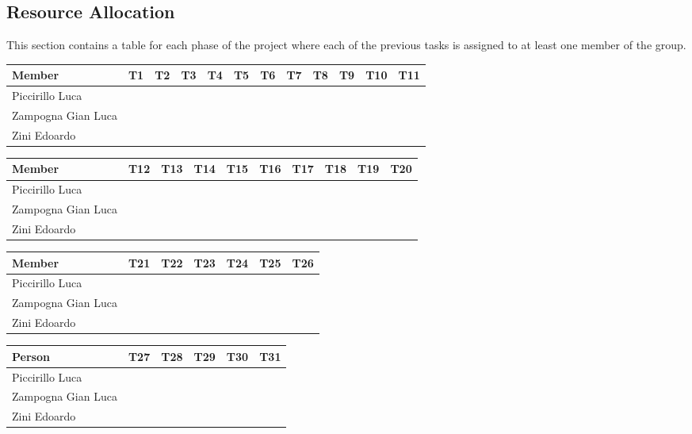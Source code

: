 \newpage
\subsection{Resource Allocation}
This section contains a table for each phase of the project where each of the previous tasks is assigned to at least one member of the group.\\

\noindent
\begin{tabular}{| l | c | c | c | c | c | c | c | c | c | c | c |}
\hline
\textbf{Member} & \textbf{T1} & \textbf{T2} & \textbf{T3} & \textbf{T4} & \textbf{T5} & \textbf{T6} & \textbf{T7} & \textbf{T8} & \textbf{T9} & \textbf{T10} & \textbf{T11}\\
\hline
Piccirillo Luca &  &  &  &  &  &  &  &  &  &  & \\
\hline
Zampogna Gian Luca &  &  &  &  &  &  &  &  &  &  & \\
\hline
Zini Edoardo &  &  &  &  &  &  &  &  &  &  & \\
\hline
\end{tabular}

\bigskip

\noindent
\begin{tabular}{| l | c | c | c | c | c | c | c | c | c |}
\hline
\textbf{Member} & \textbf{T12} & \textbf{T13} & \textbf{T14} & \textbf{T15} & \textbf{T16} & \textbf{T17} & \textbf{T18} & \textbf{T19} & \textbf{T20}\\
\hline
Piccirillo Luca &  &  &  &  &  &  &  &  & \\
\hline
Zampogna Gian Luca &  &  &  &  &  &  &  &  & \\
\hline
Zini Edoardo &  &  &  &  &  &  &  &  & \\
\hline
\end{tabular}

\bigskip

\noindent
\begin{tabular}{| l | c | c | c | c | c | c |}
\hline
\textbf{Member} & \textbf{T21} & \textbf{T22} & \textbf{T23} & \textbf{T24} & \textbf{T25} & \textbf{T26}\\
\hline
Piccirillo Luca &  &  &  &  &  & \\
\hline
Zampogna Gian Luca &  &  &  &  &  & \\
\hline
Zini Edoardo &  &  &  &  &  & \\
\hline
\end{tabular}

\bigskip

\noindent
\begin{tabular}{| l | c | c | c | c | c |}
\hline
\textbf{Person} & \textbf{T27} & \textbf{T28} & \textbf{T29} & \textbf{T30} & \textbf{T31}\\
\hline
Piccirillo Luca &  &  &  &  &  \\
\hline
Zampogna Gian Luca &  &  &  &  &  \\
\hline
Zini Edoardo &  &  &  &  &  \\
\hline
\end{tabular}